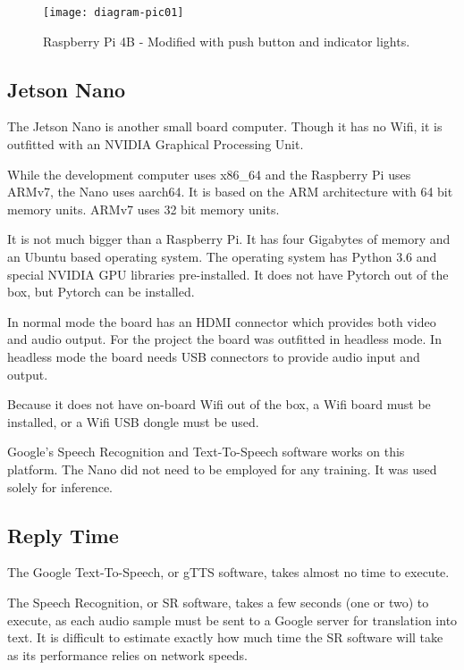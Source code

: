\begin{figure}[H]
	\begin{center}
		\texttt{[image: diagram-pic01]}
		
		
	\end{center}
	\caption[Raspberry Pi]{Raspberry Pi 4B - Modified with push button and indicator lights.}
	
	
\end{figure}

\subsection{Jetson Nano}

The Jetson Nano is another small board computer. Though it has no Wifi, it is outfitted with an NVIDIA Graphical Processing Unit. 

While the development computer uses x86\_64 and the Raspberry Pi uses ARMv7, the Nano uses aarch64. It is based on the ARM architecture with 64 bit memory units. ARMv7 uses 32 bit memory units.

It is not much bigger than a Raspberry Pi. It has four Gigabytes of memory and an Ubuntu based operating system. The operating system has Python 3.6 and special NVIDIA GPU libraries pre-installed. It does not have Pytorch out of the box, but Pytorch can be installed.

In normal mode the board has an HDMI connector which provides both video and audio output. For the project the board was outfitted in headless mode. In headless mode the board needs USB connectors to provide audio input and output.

Because it does not have on-board Wifi out of the box, a Wifi board must be installed, or a Wifi USB dongle must be used.

Google's Speech Recognition and Text-To-Speech software works on this platform. The Nano did not need to be employed for any training. It was used solely for inference.



\subsection{Reply Time}

The Google Text-To-Speech, or gTTS software, takes almost no time to execute.

The Speech Recognition, or SR software, takes a few seconds (one or two) to execute, as each audio sample must be sent to a Google server for translation into text. It is difficult to estimate exactly how much time the SR software will take as its performance relies on network speeds.

